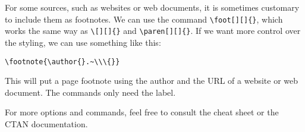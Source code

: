 For some \glspl{source}, such as websites or web documents, it is sometimes customary to include them as footnotes. We can use the \gls{command} \texttt{\textbackslash{}foot[][]\{\}}, which works the same way as \texttt{\textbackslash{}[][]\{\}} and \texttt{\textbackslash{}paren[][]\{\}}. If we want more control over the styling, we can use something like this:
\begin{center}
    \texttt{\textbackslash{}footnote\{\textbackslash{}author\{\}.\textasciitilde\textbackslash\textbackslash\textbackslash{}\{\}\}}
\end{center}

This will put a page footnote using the author and the \gls{URL} of a website or web document. The  \glspl{command} only need the \gls{label}.

For more options and \glspl{command}, feel free to consult the \BibLaTeX{} cheat sheet or the \gls{CTAN} documentation. \parencites{web:biblatex-cheat-sheet,web:ctan-biblatex}